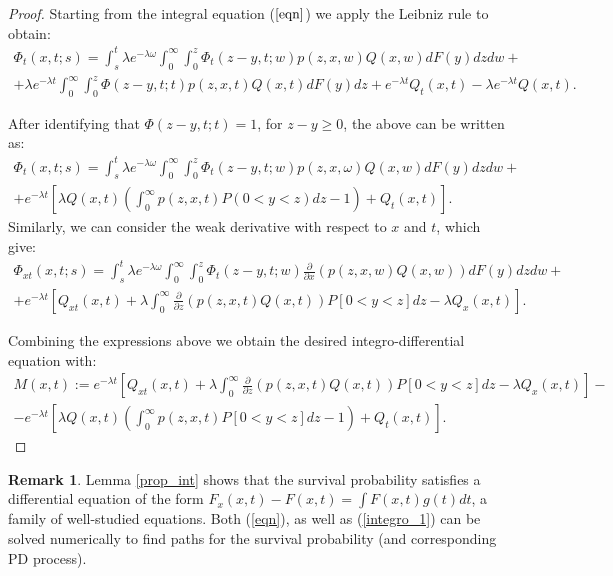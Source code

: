 \documentclass[11pt,reqno]{article}
\theoremstyle{definition}
\newtheorem{remark}[theorem]{Remark}
\begin{document}
\begin{proof}
	Starting from the integral equation ($\ref{eqn}$) we apply the Leibniz rule to obtain: 
	\begin{eqnarray}
	\Phi_{t}(x, t;s)=\int_{s}^{t} \lambda e^{-\lambda \omega} \int_{0}^{\infty} \int_{0}^{z} \Phi_{t}(z-y, t; w) p(z, x, w) Q(x, w) dF(y) dzdw+ \nonumber  \\
	+\lambda e^{-\lambda t} \int_{0}^{\infty} \int_{0}^{z} \Phi(z-y, t;t) p(z, x, t) Q(x, t) d F(y) d z +e^{-\lambda t} Q_t(x, t)-\lambda e^{-\lambda t} Q(x, t).
	\end{eqnarray}
	
	After identifying that $\Phi(z-y, t;t)=1$, for $z-y \geq 0$, the above can be written as:
	\begin{eqnarray}
	\Phi_{t}(x, t;s)=\int_{s}^{t} \lambda e^{-\lambda \omega} \int_{0}^{\infty} \int_{0}^{z} \Phi_{t}(z-y, t; w) p(z, x, \omega) Q(x, w) dF(y) d z d w+ \nonumber \\
	+ e^{-\lambda t}\left[\lambda Q(x, t)\left(\int_{0}^{\infty} p(z, x, t) P(0<y<z) d z-1\right)+Q_{t}(x, t)\right].
	\end{eqnarray}
	Similarly, we can consider the weak derivative with respect to $x$ and $t$, which give:
	\begin{eqnarray}
	\Phi_{xt}(x, t;s)=\int_{s}^{t} \lambda e^{-\lambda \omega} \int_{0}^{\infty} \int_{0}^{z} \Phi_t(z-y, t;w) \frac{\partial}{\partial x}(p(z, x, w) Q(x, w)) d F(y) d z d w + \nonumber \\
	+e^{-\lambda t}\left[Q_{x t}(x, t)+\lambda \int_{0}^{\infty} \frac{\partial}{\partial z}\left(p(z, x, t) Q(x, t)\right) P[0<y<z] d z - \lambda Q_{x}(x, t)\right].
	\end{eqnarray}
	
	Combining the expressions above we obtain the desired integro-differential equation with:
	\begin{eqnarray}
	M(x,t):= e^{-\lambda t}\left[Q_{x t}(x, t)+\lambda \int_{0}^{\infty} \frac{\partial}{\partial z}\left(p(z, x, t) Q(x, t)\right) P[0<y<z] d z - \lambda Q_{x}(x, t)\right] - \nonumber \\ - e^{-\lambda t}\left[\lambda Q(x, t)\left(\int_{0}^{\infty} p(z, x, t) P[0<y<z] d z-1\right)+Q_{t}(x, t)\right] \nonumber.
	\end{eqnarray}
	
\end{proof}
\begin{remark}
	Lemma \ref{prop_int} shows that the survival probability satisfies a differential equation of the form $ F_x(x,t) -F(x,t) = \int F(x,t) g(t) dt$, a family of well-studied equations. Both (\ref{eqn}), as well as (\ref{integro_1}) can be solved numerically to find paths for the survival probability (and corresponding PD process).
\end{remark}
\end{document}
